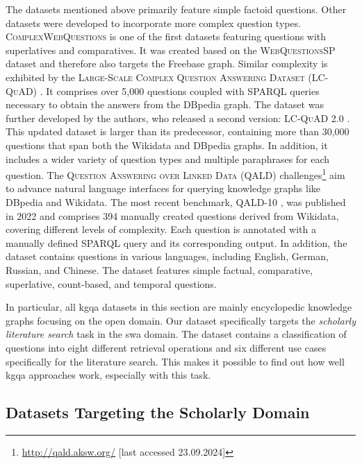 The datasets mentioned above primarily feature simple factoid questions. Other datasets were developed to incorporate more complex question types. \textsc{ComplexWebQuestions} \cite{talmor_web_2018} is one of the first datasets featuring questions with superlatives and comparatives. It was created based on the \textsc{WebQuestionsSP} dataset and therefore also targets the Freebase graph. Similar complexity is exhibited by the \textsc{Large-Scale Complex Question Answering Dataset (LC-QuAD)} \cite{trivedi_lc-quad_2017}. It comprises over 5,000 questions coupled with SPARQL queries necessary to obtain the answers from the DBpedia graph. The dataset was further developed by the authors, who released a second version: \textsc{LC-QuAD 2.0} \cite{dubey_lc-quad_2019}. This updated dataset is larger than its predecessor, containing more than 30,000 questions that span both the Wikidata and DBpedia graphs. In addition, it includes a wider variety of question types and multiple paraphrases for each question. The \textsc{Question Answering over Linked Data (QALD)} challenges\footnote{\url{http://qald.aksw.org/} [last accessed 23.09.2024]} aim to advance natural language interfaces for querying knowledge graphs like DBpedia and Wikidata. The most recent benchmark, QALD-10 \cite{usbeck_qald-10_2023}, was published in 2022 and comprises 394 manually created questions derived from Wikidata, covering different levels of complexity.  Each question is annotated with a manually defined SPARQL query and its corresponding output. In addition, the dataset contains questions in various languages, including English, German, Russian, and Chinese. The dataset features simple factual, comparative, superlative, count-based, and temporal questions.

In particular, all \gls{kgqa} datasets in this section are mainly encyclopedic knowledge graphs focusing on the open domain. Our dataset specifically targets the \emph{scholarly literature search} task in the \gls{swa} domain. The dataset contains a classification of questions into eight different retrieval operations and six different use cases specifically for the literature search. This makes it possible to find out how well \gls{kgqa} approaches work, especially with this task.

\subsection{Datasets Targeting the Scholarly Domain}

